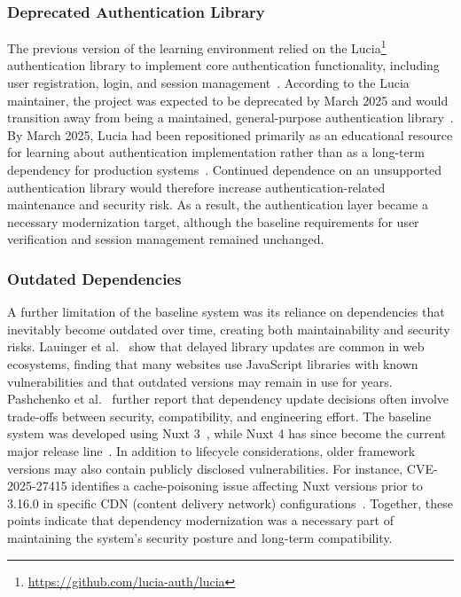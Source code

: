 \subsubsection{Deprecated Authentication Library} \label{subsubsec:deprecated-authentication-library}
The previous version of the learning environment relied on the Lucia\footnote{\url{https://github.com/lucia-auth/lucia}} authentication library to implement core authentication functionality, including user registration, login, and session management~\cite{eistre_2024}.
According to the Lucia maintainer, the project was expected to be deprecated by March 2025 and would transition away from being a maintained, general-purpose authentication library~\cite{pilcrowonpaper_fresh_start_2024}.
By March 2025, Lucia had been repositioned primarily as an educational resource for learning about authentication implementation rather than as a long-term dependency for production systems~\cite{pilcrowonpaper_fresh_start_2024}.
Continued dependence on an unsupported authentication library would therefore increase authentication-related maintenance and security risk.
As a result, the authentication layer became a necessary modernization target, although the baseline requirements for user verification and session management remained unchanged.

\subsubsection{Outdated Dependencies} \label{subsubsec:outdated-dependencies}
A further limitation of the baseline system was its reliance on dependencies that inevitably become outdated over time, creating both maintainability and security risks.
Lauinger et al.~\cite{lauinger_thou_2017} show that delayed library updates are common in web ecosystems, finding that many websites use JavaScript libraries with known vulnerabilities and that outdated versions may remain in use for years.
Pashchenko et al.~\cite{pashchenko_qualitative_2020} further report that dependency update decisions often involve trade-offs between security, compatibility, and engineering effort.
The baseline system was developed using Nuxt 3~\cite{eistre_2024}, while Nuxt 4 has since become the current major release line~\cite{nuxt_roadmap}.
In addition to lifecycle considerations, older framework versions may also contain publicly disclosed vulnerabilities.
For instance, CVE-2025-27415 identifies a cache-poisoning issue affecting Nuxt versions prior to 3.16.0 in specific CDN (content delivery network) configurations~\cite{nvd_cve_2025_27415}.
Together, these points indicate that dependency modernization was a necessary part of maintaining the system's security posture and long-term compatibility.


